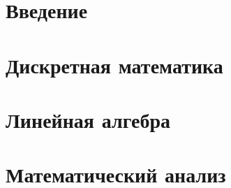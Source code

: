 \documentclass{report}
\begin{document}
\chapter*{Введение}

\tableofcontents
\chapter{Дискретная математика}

	
	
	

	
\chapter{Линейная алгебра}


	
	
	
	
	

	

	
	
	
	

	
	

	

\chapter{Математический анализ}

\end{document}
